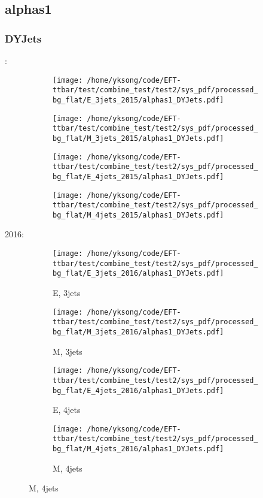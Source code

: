\documentclass{beamer}
\begin{document}
\subsection{alphas1}

\begin{frame}
\frametitle{DYJets}
\fontsize{5}{1}:
\begin{figure}
\centering
\begin{subfigure}[b]{0.24\textwidth}
\texttt{[image: /home/yksong/code/EFT-ttbar/test/combine\_test/test2/sys\_pdf/processed\_bg\_flat/E\_3jets\_2015/alphas1\_DYJets.pdf]}
\end{subfigure}
\begin{subfigure}[b]{0.24\textwidth}
\texttt{[image: /home/yksong/code/EFT-ttbar/test/combine\_test/test2/sys\_pdf/processed\_bg\_flat/M\_3jets\_2015/alphas1\_DYJets.pdf]}
\end{subfigure}
\begin{subfigure}[b]{0.24\textwidth}
\texttt{[image: /home/yksong/code/EFT-ttbar/test/combine\_test/test2/sys\_pdf/processed\_bg\_flat/E\_4jets\_2015/alphas1\_DYJets.pdf]}
\end{subfigure}
\begin{subfigure}[b]{0.24\textwidth}
\texttt{[image: /home/yksong/code/EFT-ttbar/test/combine\_test/test2/sys\_pdf/processed\_bg\_flat/M\_4jets\_2015/alphas1\_DYJets.pdf]}
\end{subfigure}
\end{figure}
2016:
\begin{figure}
\centering
\begin{subfigure}[b]{0.24\textwidth}
\texttt{[image: /home/yksong/code/EFT-ttbar/test/combine\_test/test2/sys\_pdf/processed\_bg\_flat/E\_3jets\_2016/alphas1\_DYJets.pdf]}
\captionsetup{font=tiny}
\caption{E, 3jets}
\end{subfigure}
\begin{subfigure}[b]{0.24\textwidth}
\texttt{[image: /home/yksong/code/EFT-ttbar/test/combine\_test/test2/sys\_pdf/processed\_bg\_flat/M\_3jets\_2016/alphas1\_DYJets.pdf]}
\captionsetup{font=tiny}
\caption{M, 3jets}
\end{subfigure}
\begin{subfigure}[b]{0.24\textwidth}
\texttt{[image: /home/yksong/code/EFT-ttbar/test/combine\_test/test2/sys\_pdf/processed\_bg\_flat/E\_4jets\_2016/alphas1\_DYJets.pdf]}
\captionsetup{font=tiny}
\caption{E, 4jets}
\end{subfigure}
\begin{subfigure}[b]{0.24\textwidth}
\texttt{[image: /home/yksong/code/EFT-ttbar/test/combine\_test/test2/sys\_pdf/processed\_bg\_flat/M\_4jets\_2016/alphas1\_DYJets.pdf]}
\captionsetup{font=tiny}
\caption{M, 4jets}
\end{subfigure}
\end{figure}
\end{frame}
\end{document}
